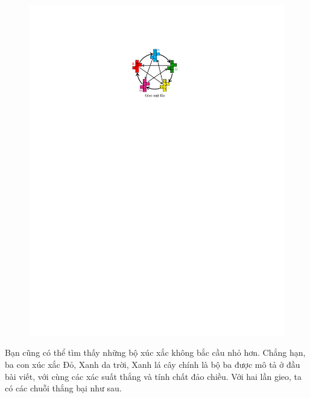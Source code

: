 \begin{multicols}{2}
	\begin{figure}[H]
		\vspace*{-5pt}
		\centering
		\captionsetup{labelformat= empty, justification=centering}
		\includegraphics[scale =1]{11}
		\vspace*{-10pt}
	\end{figure}
	Bạn cũng có thể tìm thấy những bộ xúc xắc không bắc cầu nhỏ hơn. Chẳng hạn, ba con xúc xắc Đỏ, Xanh da trời, Xanh lá cây chính là bộ ba được mô tả ở đầu bài viết, với cùng các xác suất thắng và tính chất đảo chiều.
	\vskip 0.05cm
	Với hai lần gieo, ta có các chuỗi thắng bại như sau.
	\begin{figure}[H]
		\vspace*{-5pt}
		\centering
		\captionsetup{labelformat= empty, justification=centering}

\end{figure}
\end{multicols}
